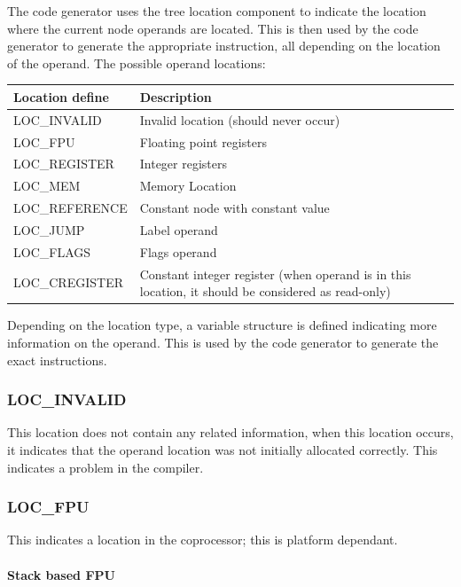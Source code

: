\documentclass [12pt]{article}
\begin{document}
The code generator uses the tree location component to indicate the location 
where the current node operands are located. This is then used by the code 
generator to generate the appropriate instruction, all depending on the 
location of the operand. The possible operand locations:

\begin{longtable}{|l|p{10cm}|}
\hline
Location define & Description \\
\hline
\endhead
\hline
\endfoot
\textsf{LOC{\_}INVALID}& 
    Invalid location (should never occur) \\
\textsf{LOC{\_}FPU}& 
    Floating point registers \\
\textsf{LOC{\_}REGISTER}& 
    Integer registers \\
\textsf{LOC{\_}MEM}& 
    Memory Location \\
\textsf{LOC{\_}REFERENCE}& 
    Constant node with constant value \\
\textsf{LOC{\_}JUMP}& 
    Label operand \\
\textsf{LOC{\_}FLAGS}& 
    Flags operand \\
\textsf{LOC{\_}CREGISTER}& 
    Constant integer register (when operand is in this
    location, it should be considered as read-only) \\
\end{longtable}

Depending on the location type, a variable structure is defined indicating 
more information on the operand. This is used by the code generator to 
generate the exact instructions.

\subsubsection{LOC{\_}INVALID}
\label{subsubsec:mylabel18}

This location does not contain any related information, when this location 
occurs, it indicates that the operand location was not initially allocated 
correctly. This indicates a problem in the compiler.

\subsubsection{LOC{\_}FPU}
\label{subsubsec:mylabel19}

This indicates a location in the coprocessor; this is platform dependant.

\paragraph{Stack based FPU}
\end{document}
